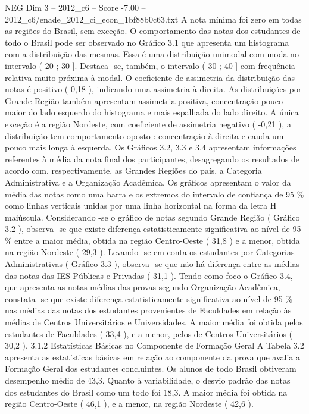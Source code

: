 \begin{textsample}{NEG Dim 3 – 2012\_c6 – Score -7.00 – 2012\_c6/enade\_2012\_ci\_econ\_1bf88b0c63.txt}
A nota mínima foi zero em todas as regiões do Brasil, sem exceção.
O comportamento das notas dos estudantes de todo o Brasil pode ser observado no Gráfico 3.1 que apresenta um histograma com a distribuição das mesmas.
Essa é uma distribuição unimodal com moda no intervalo ( 20 ; 30 ].
Destaca -se, também, o intervalo ( 30 ; 40 ] com frequência relativa muito próxima à modal.
O coeficiente de assimetria da distribuição das notas é positivo ( 0,18 ), indicando uma assimetria à direita.
As distribuições por Grande Região também apresentam assimetria positiva, concentração pouco maior do lado esquerdo do histograma e mais espalhada do lado direito.
A única exceção é a região Nordeste, com coeficiente de assimetria negativo ( -0,21 ), a distribuição tem comportamento oposto : concentração à direita e cauda um pouco mais longa à esquerda.
Os Gráficos 3.2, 3.3 e 3.4 apresentam informações referentes à média da nota final dos participantes, desagregando os resultados de acordo com, respectivamente, as Grandes Regiões do país, a Categoria Administrativa e a Organização Acadêmica.
Os gráficos apresentam o valor da média das notas como uma barra e os extremos do intervalo de confiança de 95 \% como linhas verticais unidas por uma linha horizontal na forma da letra H maiúscula.
Considerando -se o gráfico de notas segundo Grande Região ( Gráfico 3.2 ), observa -se que existe diferença estatisticamente significativa ao nível de 95 \% entre a maior média, obtida na região Centro-Oeste ( 31,8 ) e a menor, obtida na região Nordeste ( 29,3 ).
Levando -se em conta os estudantes por Categorias Administrativas ( Gráfico 3.3 ), observa -se que não há diferença entre as médias das notas das IES Públicas e Privadas ( 31,1 ).
Tendo como foco o Gráfico 3.4, que apresenta as notas médias das provas segundo Organização Acadêmica, constata -se que existe diferença estatisticamente significativa ao nível de 95 \% nas médias das notas dos estudantes provenientes de Faculdades em relação às médias de Centros Universitários e Universidades.
A maior média foi obtida pelos estudantes de Faculdades ( 33,4 ), e a menor, pelos de Centros Universitários ( 30,2 ). 3.1.2 Estatísticas Básicas no Componente de Formação Geral A Tabela 3.2 apresenta as estatísticas básicas em relação ao componente da prova que avalia a Formação Geral dos estudantes concluintes.
Os alunos de todo Brasil obtiveram desempenho médio de 43,3.
Quanto à variabilidade, o desvio padrão das notas dos estudantes do Brasil como um todo foi 18,3.
A maior média foi obtida na região Centro-Oeste ( 46,1 ), e a menor, na região Nordeste ( 42,6 ).

\end{textsample}
